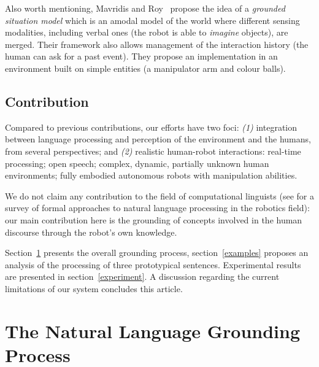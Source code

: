 
Also worth mentioning, Mavridis and Roy~\cite{Mavridis2005} propose the idea of
a \emph{grounded situation model} which is an amodal model of the world where
different sensing modalities, including verbal ones (the robot is able to
\emph{imagine} objects), are merged. Their framework also allows management of
the interaction history (the human can ask for a past event). They propose an
implementation in an environment built on simple entities (a manipulator arm
and colour balls).

\subsection{Contribution}

Compared to previous contributions, our efforts have two foci: {\it (1)}
integration between language processing and perception of the environment and
the humans, from several perspectives; and {\it (2)} realistic human-robot interactions:
real-time processing; open speech; complex, dynamic, partially unknown human environments; fully
embodied autonomous robots with manipulation abilities. 

We do not claim any contribution to the field of computational linguists (see
\cite{Kruijff2010} for a survey of formal approaches to natural language
processing in the robotics field): our main contribution here is the grounding
of concepts involved in the human discourse through the robot's own knowledge.

Section~\ref{dialog} presents the overall grounding process, section~\ref{examples} 
proposes an analysis of the processing of three prototypical sentences. 
Experimental results are presented in section~\ref{experiment}. A 
discussion regarding the current limitations of our system concludes
this article.

\section{The Natural Language Grounding Process}
\label{dialog}

